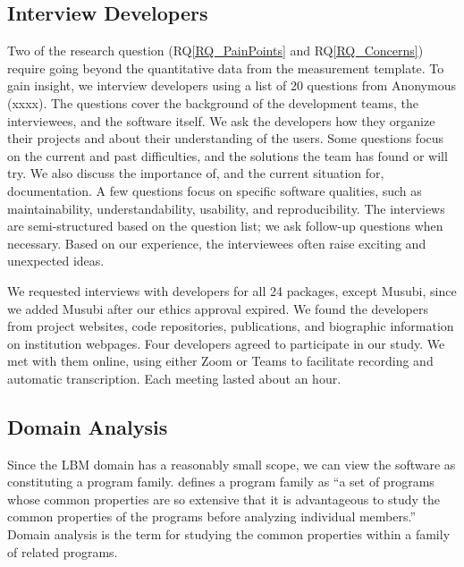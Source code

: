 \documentclass[final, 3p, times, authoryear]{elsarticle}
\newcommand{\rqref}[1]{RQ\ref{#1}}
\begin{document}
\subsection{Interview Developers} \label{SecSurvey}

Two of the research question (\rqref{RQ_PainPoints} and \rqref{RQ_Concerns})
require going beyond the quantitative data from the measurement template. To
gain insight, we interview developers using a list of 20 questions from Anonymous (xxxx)\footnotemark[1].
The questions cover the background of the development
teams, the interviewees, and the software itself. We ask the developers how they
organize their projects and about their understanding of the users. Some
questions focus on the current and past difficulties, and the solutions the team
has found or will try. We also discuss the importance of, and the current
situation for, documentation. A few questions focus on specific software
qualities, such as maintainability, understandability, usability, and
reproducibility. The interviews are semi-structured based on the question list;
we ask follow-up questions when necessary. Based on our experience, the
interviewees often raise exciting and unexpected ideas.

We requested interviews with developers for all 24 packages, except Musubi,
since we added Musubi after our ethics approval expired. We found the developers
from project websites, code repositories, publications, and biographic
information on institution webpages. Four developers agreed to participate in
our study. We met with them online, using either Zoom or Teams to facilitate
recording and automatic transcription. Each meeting lasted about an hour. 

\subsection{Domain Analysis} \label{SecDomainAnalysis}

Since the LBM domain has a reasonably small scope, we can view the software as
constituting a program family.  \citet{parnas1976design} defines a program
family as ``a set of programs whose common properties are so extensive that it
is advantageous to study the common properties of the programs before analyzing
individual members.'' Domain analysis is the term for studying the common
properties within a family of related programs.
\end{document}
